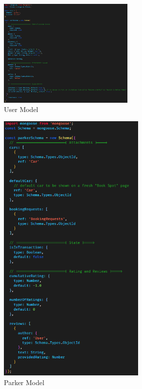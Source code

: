         \begin{figure}[h]
            \centering
            \includegraphics[width=0.6\textwidth]{images/userModel.png}
            \caption{User Model}
            \label{fig:userModel}
        \end{figure}

        \begin{figure}[h]
            \centering
            \includegraphics[width=0.65\textwidth]{images/parkerModel.png}
            \caption{Parker Model}
            \label{fig:parkerModel}
        \end{figure}


